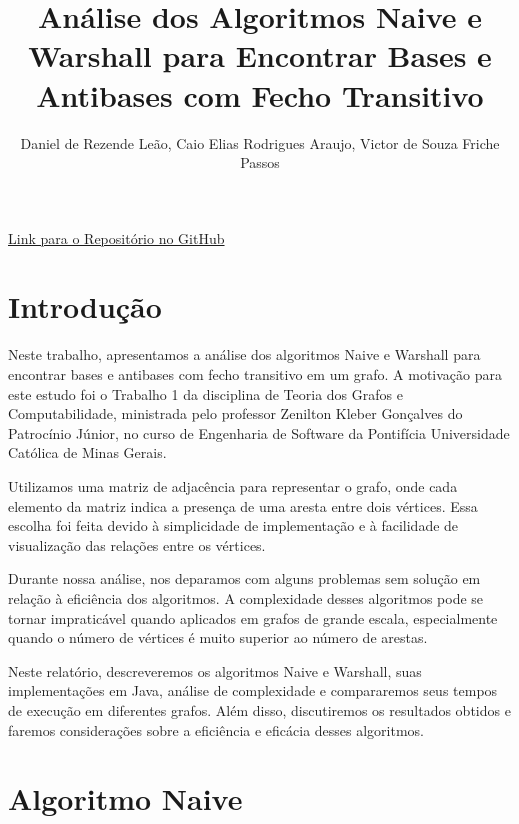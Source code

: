 \documentclass{article}
\title{Análise dos Algoritmos Naive e Warshall para Encontrar Bases e Antibases com Fecho Transitivo}
\author{Daniel de Rezende Leão, Caio Elias Rodrigues Araujo, Victor de Souza Friche Passos}
\begin{document}
\maketitle

\href{https://github.com/danielrleao/ex1GrafosNaiveWarshall}{Link para o Repositório no GitHub}\

\section{Introdução}
\par    Neste trabalho, apresentamos a análise dos algoritmos Naive e Warshall para encontrar bases e antibases com fecho transitivo em um grafo. A motivação para este estudo foi o Trabalho 1 da disciplina de Teoria dos Grafos e Computabilidade, ministrada pelo professor Zenilton Kleber Gonçalves do Patrocínio Júnior, no curso de Engenharia de Software da Pontifícia Universidade Católica de Minas Gerais.
\vspace{10pt} %
\par Utilizamos uma matriz de adjacência para representar o grafo, onde cada elemento da matriz indica a presença de uma aresta entre dois vértices. Essa escolha foi feita devido à simplicidade de implementação e à facilidade de visualização das relações entre os vértices.
\vspace{10pt} %
\par Durante nossa análise, nos deparamos com alguns problemas sem solução em relação à eficiência dos algoritmos. A complexidade desses algoritmos pode se tornar impraticável quando aplicados em grafos de grande escala, especialmente quando o número de vértices é muito superior ao número de arestas.
\vspace{10pt} %
\par Neste relatório, descreveremos os algoritmos Naive e Warshall, suas implementações em Java, análise de complexidade e compararemos seus tempos de execução em diferentes grafos. Além disso, discutiremos os resultados obtidos e faremos considerações sobre a eficiência e eficácia desses algoritmos.




\section{Algoritmo Naive}

\end{document}
